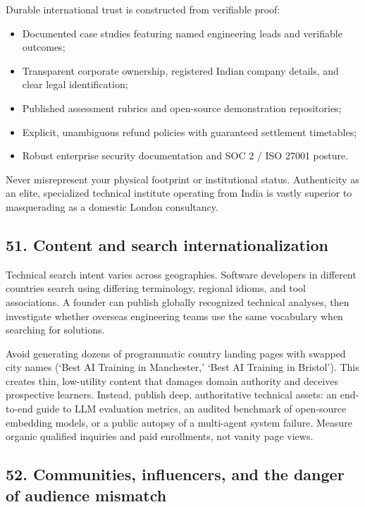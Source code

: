Durable international trust is constructed from verifiable proof:
\begin{itemize}
    \item Documented case studies featuring named engineering leads and verifiable outcomes;
    \item Transparent corporate ownership, registered Indian company details, and clear legal identification;
    \item Published assessment rubrics and open-source demonstration repositories;
    \item Explicit, unambiguous refund policies with guaranteed settlement timetables;
    \item Robust enterprise security documentation and SOC 2 / ISO 27001 posture.
\end{itemize}
Never misrepresent your physical footprint or institutional status. Authenticity as an elite, specialized technical institute operating from India is vastly superior to masquerading as a domestic London consultancy.

\subsection{51. Content and search internationalization}

Technical search intent varies across geographies. Software developers in different countries search using differing terminology, regional idioms, and tool associations. A founder can publish globally recognized technical analyses, then investigate whether overseas engineering teams use the same vocabulary when searching for solutions.

Avoid generating dozens of programmatic country landing pages with swapped city names (`Best AI Training in Manchester,' `Best AI Training in Bristol'). This creates thin, low-utility content that damages domain authority and deceives prospective learners. Instead, publish deep, authoritative technical assets: an end-to-end guide to LLM evaluation metrics, an audited benchmark of open-source embedding models, or a public autopsy of a multi-agent system failure. Measure organic qualified inquiries and paid enrollments, not vanity page views.

\subsection{52. Communities, influencers, and the danger of audience mismatch}

